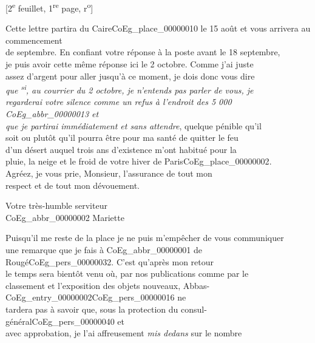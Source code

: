 \documentclass{book}
\begin{document}
{\footnotesize\begin{center} {[2\textsuperscript{e} feuillet, 1\textsuperscript{re} page, r\textsuperscript{o}]}\end{center}}
\noindent Cette lettre partira du Caire\gls{CoEg_place_00000010} le 15 août et vous arrivera au commencement\\
de septembre. En confiant votre réponse à la poste avant le 18 septembre,\\
je puis avoir cette même réponse ici le 2 octobre. Comme j’ai juste\\
assez d’argent pour aller jusqu’à ce moment, je dois donc vous dire\\
\textit{que \textsuperscript{si}, au courrier du 2 octobre, je n’entends pas parler de vous, je\\
regarderai votre silence comme un refus à l’endroit des 5 000 \gls{CoEg_abbr_00000013} et\\
que je partirai immédiatement et sans attendre}, quelque pénible qu’il\\
soit ou plutôt qu’il pourra être pour ma santé de quitter le feu\\
d’un désert auquel trois ans d’existence m’ont habitué pour la\\
pluie, la neige et le froid de votre hiver de Paris\gls{CoEg_place_00000002}.\\
\indent Agréez, je vous prie, Monsieur, l’assurance de tout mon\\
respect et de tout mon dévouement.
\begin{center}\hspace{5cm} Votre très-humble serviteur\\
\hspace{5cm} \gls{CoEg_abbr_00000002} Mariette\end{center}
\indent Puisqu’il me reste de la place je ne puis m’empêcher de vous communiquer\\
une remarque que je fais à \gls{CoEg_abbr_00000001} de Rougé\gls{CoEg_pers_00000032}. C’est qu’après mon retour\\
le temps sera bientôt venu où, par nos publications comme par le\\
classement et l’exposition des objets nouveaux, Abbas-\Gls{CoEg_entry_00000002}\gls{CoEg_pers_00000016} ne\\
tardera pas à savoir que, sous la protection du consul-général\gls{CoEg_pers_00000040} et\\
avec approbation, je l’ai affreusement \textit{mis dedans} sur le nombre\\
\end{document}
